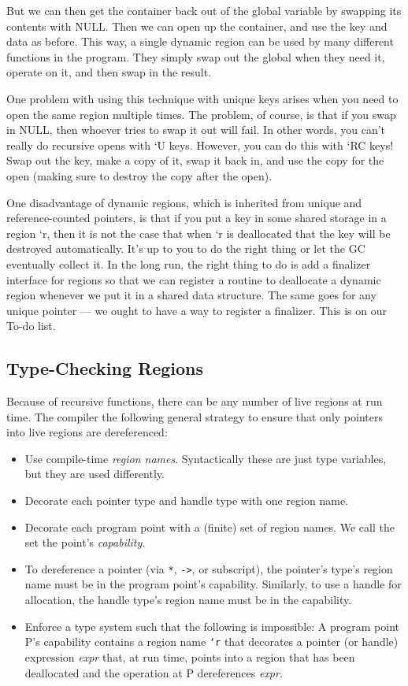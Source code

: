 But we can then get the container back out of the global variable by
swapping its contents with NULL.  Then we can open up the container, and use
the key and data as before.  This way, a single dynamic region can be used
by many different functions in the program.  They simply swap out the global
when they need it, operate on it, and then swap in the result.

One problem with using this technique with unique keys arises when you need
to open the same region multiple times.  The problem, of course, is that if
you swap in NULL, then whoever tries to swap it out will fail.  In other
words, you can't really do recursive opens with `U keys.  However, you can
do this with `RC keys!  Swap out the key, make a copy of it, swap it back
in, and use the copy for the open (making sure to destroy the copy after the
open).
  
One disadvantage of dynamic regions, which is inherited from unique and
reference-counted pointers, is that if you put a key in some shared storage
in a region `r, then it is not the case that when `r is deallocated that the
key will be destroyed automatically.  It's up to you to do the right thing
or let the GC eventually collect it.  In the long run, the right thing to do
is add a finalizer interface for regions so that we can register a routine
to deallocate a dynamic region whenever we put it in a shared data
structure.  The same goes for any unique pointer --- we ought to have a way
to register a finalizer.  This is on our To-do list.

\subsection{Type-Checking Regions}

Because of recursive functions, there can be any number of live
regions at run time.  The compiler the following general strategy to
ensure that only pointers into live regions are dereferenced:

\begin{itemize}
\item Use compile-time \emph{region names}.  Syntactically these are
  just type variables, but they are used differently.
\item Decorate each pointer type and handle type with one region name. 
\item Decorate each program point with a (finite) set of region names.
  We call the set the point's \emph{capability}.
\item To dereference a pointer (via \texttt{*}, \texttt{->}, or
  subscript), the pointer's type's region name must be in the program
  point's capability.  Similarly, to use a handle for allocation, the
  handle type's region name must be in the capability.
\item Enforce a type system such that the following is impossible: A
  program point P's capability contains a region name \texttt{`r} that
  decorates a pointer (or handle) expression \textit{expr} that, at
  run time, points into a region that has been deallocated and the
  operation at P dereferences \textit{expr}.
\end{itemize}

